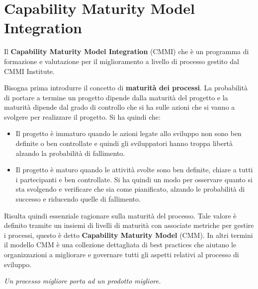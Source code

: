 \chapter{Capability Maturity Model Integration}
Il \textbf{Capability Maturity Model Integration} (CMMI) che è un programma di
formazione e valutazione per il miglioramento a livello di processo gestito dal
CMMI Institute.

Bisogna prima introdurre il concetto di \textbf{maturità dei processi}. La
probabilità di portare a termine un progetto dipende dalla maturità del progetto e
la maturità dipende dal grado di controllo che si ha sulle azioni che si vanno a
svolgere per realizzare il progetto. Si ha quindi che:
\begin{itemize}
    \item Il progetto è immaturo quando le azioni legate allo sviluppo non sono
          ben definite o ben controllate e quindi gli sviluppatori hanno troppa libertà
          alzando la probabilità di fallimento.
    \item Il progetto è maturo quando le attività svolte sono ben definite,
          chiare a tutti i partecipanti e ben controllate. Si ha quindi un modo per
          osservare quanto si sta svolgendo e verificare che sia come pianificato,
          alzando le probabilità di successo e riducendo quelle di fallimento.
\end{itemize}

Risulta quindi essenziale ragionare sulla maturità del processo. Tale valore è
definito tramite un insiemi di livelli di maturità con associate metriche per gestire
i processi, questo è detto \textbf{Capability Maturity Model} (CMM). In altri
termini il modello CMM è una collezione dettagliata di best practices che aiutano
le organizzazioni a migliorare e governare tutti gli aspetti relativi al
processo di sviluppo.
\begin{center}
    \textit{Un processo migliore porta ad un prodotto migliore.}
\end{center}


